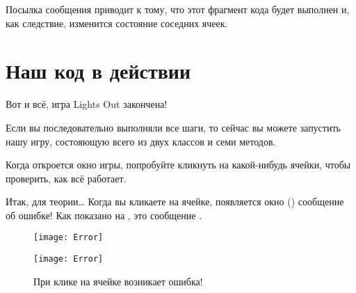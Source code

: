 \documentclass[a4paper,10pt,twoside]{book}
\begin{document}
{ 

\noindent
Посылка сообщения  приводит к тому, что этот фрагмент кода будет выполнен и, как следствие, изменится состояние соседних ячеек.

\section{Наш код в действии}

Вот и всё, игра Lights Out закончена!

Если вы последовательно выполняли все шаги, то сейчас вы можете запустить нашу игру, состояющую всего из двух классов и семи методов.


Когда откроется окно игры, попробуйте кликнуть на какой-нибудь ячейки, чтобы проверить, как всё работает.

Итак, для теории\ldots{}
Когда вы кликаете на ячейке, появляется окно  () сообщение об ошибке!
Как показано на , это сообщение .

\begin{figure}[ht]
\ifluluelse
	{\centerline{\texttt{[image: Error]}}}
	{\centerline{\texttt{[image: Error]}}}
\caption{При клике на ячейке возникает ошибка!
}
\end{figure}

}
\end{document}
